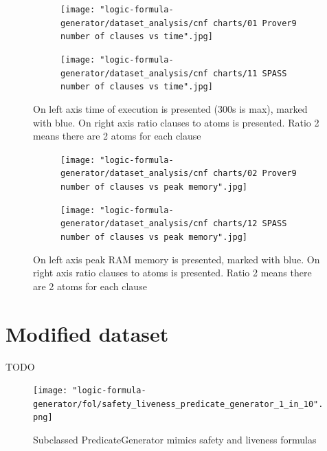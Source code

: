 \newpage

\begin{figure}[H]
\centering
  \begin{subfigure}{0.8\textwidth}
\centering
  \texttt{[image: "logic-formula-generator/dataset\_analysis/cnf charts/01 Prover9 number of clauses vs time".jpg]}
  \label{pic:benchmark_results}
  \end{subfigure}

  \begin{subfigure}{\textwidth}
\centering
  \texttt{[image: "logic-formula-generator/dataset\_analysis/cnf charts/11 SPASS number of clauses vs time".jpg]}
  \end{subfigure}
  \caption{On left axis time of execution is presented (300s is max), marked with blue. On right axis ratio clauses to atoms is presented. Ratio 2 means there are 2 atoms for each clause}
  \label{pic:SPASSProverNumberOfClauses}
\end{figure}

\begin{figure}[H]
\centering
  \begin{subfigure}{0.8\textwidth}
\centering
  \texttt{[image: "logic-formula-generator/dataset\_analysis/cnf charts/02 Prover9 number of clauses vs peak memory".jpg]}
  \label{pic:benchmark_results}
  \end{subfigure}

  \begin{subfigure}{\textwidth}
\centering
\texttt{[image: "logic-formula-generator/dataset\_analysis/cnf charts/12 SPASS number of clauses vs peak memory".jpg]}
  \end{subfigure}
  \caption{On left axis peak RAM memory is presented, marked with blue. On right axis ratio clauses to atoms is presented. Ratio 2 means there are 2 atoms for each clause}
  \label{pic:SPASSProverMemory}
\end{figure}

\section{Modified dataset}

TODO

\begin{figure}[H]
\begin{centering}
  \texttt{[image: "logic-formula-generator/fol/safety\_liveness\_predicate\_generator\_1\_in\_10".png]}
  \caption{Subclassed PredicateGenerator mimics safety and liveness formulas}
\end{centering}
\end{figure}

